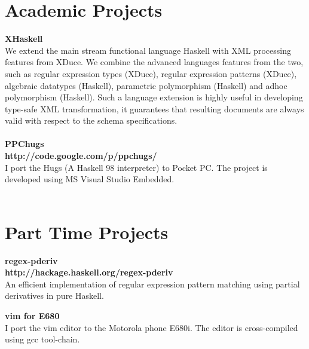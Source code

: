 \documentclass[margin,line]{res}
\newcommand{\researchonly}[1]{#1}
\newcommand{\ignore}[1]{}
\begin{document}
\begin{resume}
{\section{\sc Academic Projects} 
{\bf XHaskell }\\
We extend the main stream functional language Haskell with XML processing features from XDuce. 
We combine the advanced languages features from the two, such as regular expression types (XDuce),
regular expression patterns (XDuce), algebraic datatypes (Haskell),
parametric polymorphism (Haskell) and adhoc polymorphism (Haskell).
Such a language extension is highly useful in developing 
type-safe XML transformation, it guarantees that resulting
documents are always valid with respect to the schema specifications.
\\ \\
{\bf PPChugs} \\
{\bf http://code.google.com/p/ppchugs/} \\
I port the Hugs (A Haskell 98 interpreter) to Pocket PC.
The project is developed using MS Visual Studio Embedded.
\\ \\
\section{\sc Part Time Projects} 
{\bf regex-pderiv} \\
{\bf http://hackage.haskell.org/regex-pderiv} \\
An efficient implementation of regular expression pattern matching using partial derivatives in pure Haskell.

{\bf vim for E680} \\
I port the vim editor to the Motorola phone E680i.
The editor is cross-compiled using gcc tool-chain.
\\ \\
\ignore{
{\bf Eship-biz Web-portal} \\
Applying state-of-art methods and tools to develop a commercialized web portal 
for E-Ship Business Ptd. We developed an online portal to facilitate services like product enquiry, stock update, PO transaction, payment
transaction, delivery tracking. \researchonly{The system is developed on WindowsNT platform using a IIS webserver. Varies
system component are developed using ASP, C++ and Java frameworks. The integration is done via JNI API. The 
unifying stock update component plays an important role in the system, which operates by message/data passing
using XML documents.} }
\\ \\



}
\end{resume}
\end{document}
